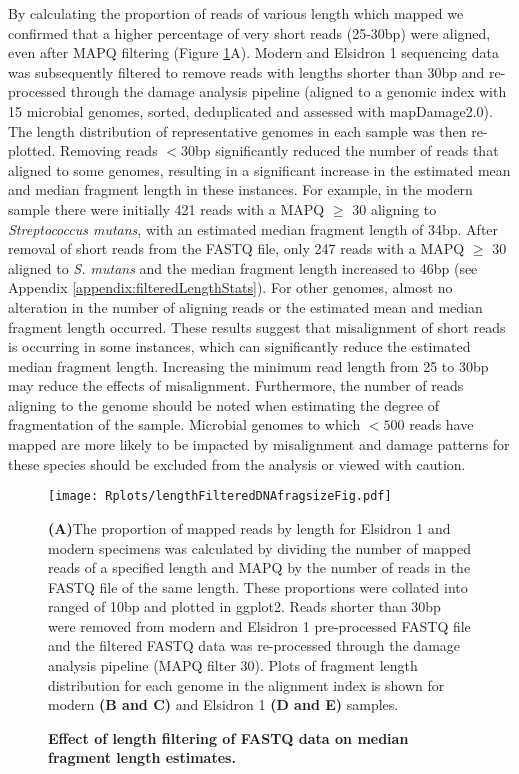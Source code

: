 \documentclass[12pt, a4paper]{article}
\begin{document}
By calculating the proportion of reads of various length which mapped we confirmed that a higher percentage of very short reads (25-30bp) were aligned, even after MAPQ filtering (Figure \ref{fig:lengthFilteredDistCompare}A). 
Modern and Elsidron 1 sequencing data was subsequently filtered to remove reads with lengths shorter than 30bp and re-processed through the damage analysis pipeline (aligned to a genomic index with 15 microbial genomes, sorted, deduplicated and assessed with mapDamage2.0).
The length distribution of representative genomes in each sample was then re-plotted. 
Removing reads $<$30bp significantly reduced the number of reads that aligned to some genomes, resulting in a significant increase in the estimated mean and median fragment length in these instances. 
For example, in the modern sample there were initially 421 reads with a MAPQ $\geq$ 30 aligning to \textit{Streptococcus mutans}, with an estimated median fragment length of 34bp. After removal of short reads from the FASTQ file, only 247 reads with a MAPQ $\geq$ 30 aligned to \textit{S. mutans} and the median fragment length increased to 46bp (see Appendix \ref{appendix:filteredLengthStats}).
For other genomes, almost no alteration in the number of aligning reads or the estimated mean and median fragment length occurred.
These results suggest that misalignment of short reads is occurring in some instances, which can significantly reduce the estimated median fragment length. 
Increasing the minimum read length from 25 to 30bp may reduce the effects of misalignment.
Furthermore, the number of reads aligning to the genome should be noted when estimating the degree of fragmentation of the sample. 
Microbial genomes to which $<500$ reads have mapped are more likely to be impacted by misalignment and damage patterns for these species should be excluded from the analysis or viewed with caution.

\begin{figure}[ht!]
	\setlength{\abovecaptionskip}{4pt}
	\begin{center}
	\texttt{[image: Rplots/lengthFilteredDNAfragsizeFig.pdf]}
	\end{center}
	\caption[Effect of length filtering of FASTQ data on median fragment length estimates]{\textbf{Effect of length filtering of FASTQ data on median fragment length estimates.}} \small{\textbf{(A)}The proportion of mapped reads by length for Elsidron 1 and modern specimens was calculated by dividing the number of mapped reads of a specified length and MAPQ by the number of reads in the FASTQ file of the same length. These proportions were collated into ranged of 10bp and plotted in ggplot2. Reads shorter than 30bp were removed from modern and Elsidron 1 pre-processed FASTQ file and the filtered FASTQ data was re-processed through the damage analysis pipeline (MAPQ filter 30). Plots of fragment length distribution for each genome in the alignment index is shown for modern \textbf{(B and C)} and Elsidron 1 \textbf{(D and E)} samples.}\label{fig:lengthFilteredDistCompare}
\end{figure}
\clearpage
\end{document}
